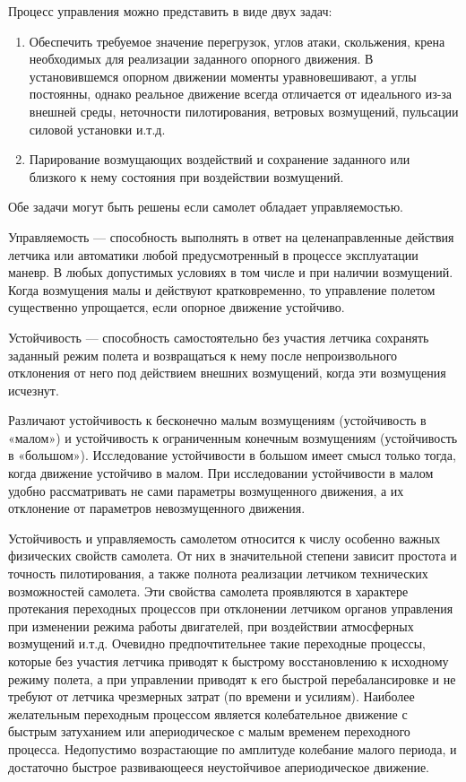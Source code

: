 \documentclass{article}
\begin{document}
Процесс управления можно представить в виде двух задач:
\begin{enumerate}
	\item Обеспечить требуемое значение перегрузок, углов атаки, скольжения,
	      крена необходимых для реализации заданного опорного движения. В
	      установившемся опорном движении моменты уравновешивают, а углы
	      постоянны, однако реальное движение всегда отличается от идеального
	      из-за внешней среды, неточности пилотирования, ветровых возмущений,
	      пульсации силовой установки и.т.д.

	\item Парирование возмущающих воздействий и сохранение заданного или
	      близкого к нему состояния при воздействии возмущений.
\end{enumerate}
Обе задачи могут быть решены если самолет обладает управляемостью.

Управляемость --- способность выполнять в ответ на целенаправленные действия
летчика или автоматики любой предусмотренный в процессе эксплуатации маневр. В
любых допустимых условиях в том числе и при наличии возмущений. Когда
возмущения малы и действуют кратковременно, то управление полетом существенно
упрощается, если опорное движение устойчиво.

Устойчивость --- способность самостоятельно без участия летчика сохранять
заданный режим полета и возвращаться к нему после непроизвольного отклонения от
него под действием внешних возмущений, когда эти возмущения исчезнут.

Различают устойчивость к бесконечно малым возмущениям (устойчивость в «малом»)
и устойчивость к ограниченным конечным возмущениям (устойчивость в «большом»).
Исследование устойчивости в большом имеет смысл только тогда, когда движение
устойчиво в малом. При исследовании устойчивости в малом удобно рассматривать
не сами параметры возмущенного движения, а их отклонение от параметров
невозмущенного движения.

Устойчивость и управляемость самолетом относится к числу особенно важных
физических свойств самолета. От них в значительной степени зависит простота и
точность пилотирования, а также полнота реализации летчиком технических
возможностей самолета. Эти свойства самолета проявляются в характере протекания
переходных процессов при отклонении летчиком органов управления при изменении
режима работы двигателей, при воздействии атмосферных возмущений и.т.д.
Очевидно предпочтительнее такие переходные процессы, которые без участия
летчика приводят к быстрому восстановлению к исходному режиму полета, а при
управлении приводят к его быстрой перебалансировке и не требуют от летчика
чрезмерных затрат (по времени и усилиям). Наиболее желательным переходным
процессом является колебательное движение с быстрым затуханием или
апериодическое с малым временем переходного процесса. Недопустимо возрастающие
по амплитуде колебание малого периода, и достаточно быстрое развивающееся
неустойчивое апериодическое движение.
\end{document}
